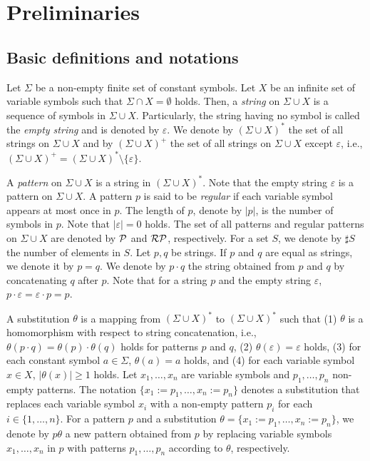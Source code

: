 \section{Preliminaries}

\subsection{Basic definitions and notations}\label{subsec:basicdef}

Let $\Sigma$ be a non-empty finite set of constant symbols.
Let $X$ be an infinite set of variable symbols such that $\Sigma \cap X = \emptyset$ holds.
Then, a \textit{string} on $\Sigma \cup X$ is a sequence of symbols in $\Sigma \cup X$.
Particularly, the string having no symbol is called the \textit{empty string} and is denoted by $\varepsilon$.
We denote by $(\Sigma \cup X)^{\ast}$ the set of all strings on $\Sigma \cup X$ 
and by $(\Sigma \cup X)^{+}$ the set of all strings on $\Sigma\cup X$ except $\varepsilon$, i.e., $(\Sigma \cup X)^{+}=(\Sigma \cup X)^{\ast}\setminus \{\varepsilon\}$.

A \textit{pattern} on $\Sigma \cup X$ is a string in $(\Sigma \cup X)^{\ast}$.
Note that the empty string $\varepsilon$ is a pattern on $\Sigma \cup X$.
A pattern $p$ is said to be \textit{regular} if each variable symbol appears
at most once in $p$.
The length of $p$, denote by $|p|$, is the number of symbols in $p$.
Note that $|\varepsilon|=0$ holds.
The set of all patterns and regular patterns on $\Sigma \cup X$ are denoted by $\mathcal{P}$ and $\mathcal{RP}$, respectively.
For a set $S$, we denote by $\sharp S$ the number of elements in $S$.
Let $p,q$ be strings.
If $p$ and $q$ are equal as strings, we denote it by $p=q$.
We denote by $p\cdot q$ the string obtained from $p$ and $q$ by concatenating $q$ after $p$.
Note that for a string $p$ and the empty string $\varepsilon$, $p\cdot \varepsilon = \varepsilon \cdot p = p$.

A substitution $\theta$ is a mapping from $(\Sigma \cup X)^{\ast}$ to $(\Sigma \cup X)^{\ast}$ such that
(1) $\theta$ is a homomorphism with respect to string concatenation, i.e., $\theta(p \cdot q) = \theta(p) \cdot \theta(q)$ holds for patterns $p$ and $q$,
(2) $\theta(\varepsilon)=\varepsilon$ holds,
(3) for each constant symbol $a \in \Sigma$, $\theta(a) = a$ holds,
and (4) for each variable symbol $x \in X$, $|\theta(x)| \geq 1$ holds.
Let $x_{1},\ldots,x_{n}$ are variable symbols and $p_{1},\ldots,p_{n}$ non-empty patterns.
The notation $\{x_{1}:=p_{1},\ldots,x_{n}:=p_{n}\}$ denotes a substitution that replaces each variable symbol $x_{i}$
with a non-empty pattern $p_{i}$ for each $i \in \{1,\ldots,n\}$.
For a pattern $p$ and a substitution $\theta=\{x_{1}:=p_{1},\ldots,x_{n}:=p_{n}\}$, we denote by $p\theta$ a new pattern obtained from $p$ by replacing variable symbols $x_1,\ldots,x_n$ in $p$ with patterns $p_1,\ldots,p_n$ according to $\theta$, respectively.


